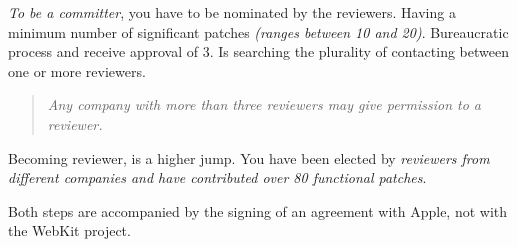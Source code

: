 \par \textit{To be a committer}, you have to be nominated by the reviewers. Having a minimum number of significant patches \textit{(ranges between 10 and 20)}. Bureaucratic process and receive approval of 3. Is searching the plurality of contacting between one or more reviewers.

\begin{quotation}
    \textit{Any company with more than three reviewers may give permission to a reviewer.}
\end{quotation}

\par Becoming reviewer, is a higher jump. You have been elected by \textit{reviewers from different companies and have contributed over 80 functional patches}.

\par Both steps are accompanied by the signing of an agreement with Apple, not with the WebKit project.

